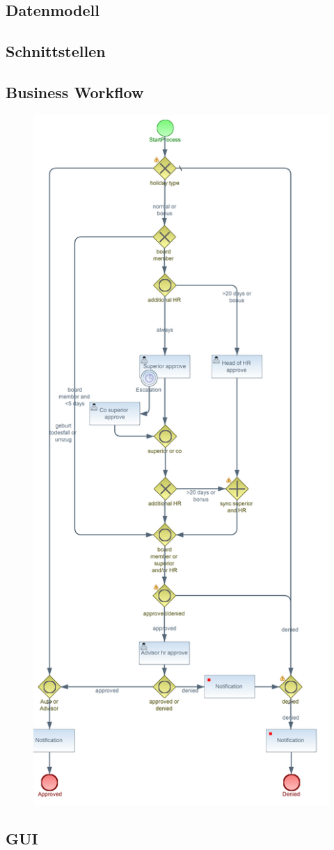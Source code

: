 \subsection{Datenmodell}

\subsection{Schnittstellen}

\subsection{Business Workflow}

\begin{figure}
\centering
\includegraphics[width=0.7\linewidth]{Bilder/Urlaubsantrag}
\caption{}
\label{fig:Urlaubsantrag}
\end{figure}


\subsection{GUI}